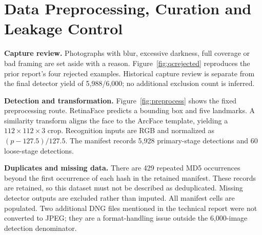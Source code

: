 \documentclass[11pt,a4paper]{article}
\newcommand{\nextpage}{\clearpage}
\begin{document}
\nextpage
\section{Data Preprocessing, Curation and Leakage Control}
\textbf{Capture review.} Photographs with blur, excessive darkness, full coverage or bad framing are set aside with a reason. Figure~\ref{fig:qcrejected} reproduces the prior report's four rejected examples. Historical capture review is separate from the final detector yield of 5,988/6,000; no additional exclusion count is inferred.

\textbf{Detection and transformation.} Figure~\ref{fig:preprocess} shows the fixed preprocessing route. RetinaFace predicts a bounding box and five landmarks. A similarity transform aligns the face to the ArcFace template, yielding a $112\times112\times3$ crop. Recognition inputs are RGB and normalized as $(p-127.5)/127.5$. The manifest records 5,928 primary-stage detections and 60 loose-stage detections.
\begin{center}
\label{fig:preprocess}
\end{center}
\textbf{Duplicates and missing data.} There are 429 repeated MD5 occurrences beyond the first occurrence of each hash in the retained manifest. These records are retained, so this dataset must not be described as deduplicated. Missing detector outputs are excluded rather than imputed. All manifest cells are populated. Two additional DNG files mentioned in the technical report were not converted to JPEG; they are a format-handling issue outside the 6,000-image detection denominator.
\end{document}
